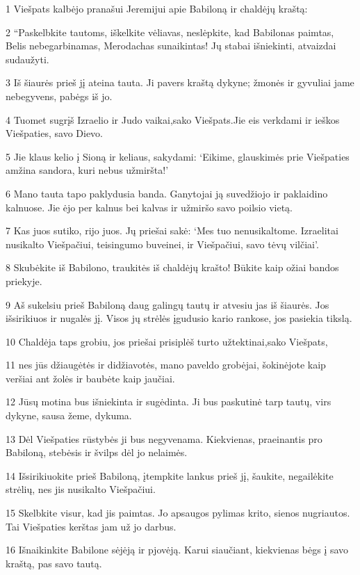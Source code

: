 \par 1 Viešpats kalbėjo pranašui Jeremijui apie Babiloną ir chaldėjų kraštą: 
\par 2 “Paskelbkite tautoms, iškelkite vėliavas, neslėpkite, kad Babilonas paimtas, Belis nebegarbinamas, Merodachas sunaikintas! Jų stabai išniekinti, atvaizdai sudaužyti. 
\par 3 Iš šiaurės prieš jį ateina tauta. Ji pavers kraštą dykyne; žmonės ir gyvuliai jame nebegyvens, pabėgs iš jo. 
\par 4 Tuomet sugrįš Izraelio ir Judo vaikai,­sako Viešpats.­Jie eis verkdami ir ieškos Viešpaties, savo Dievo. 
\par 5 Jie klaus kelio į Sioną ir keliaus, sakydami: ‘Eikime, glauskimės prie Viešpaties amžina sandora, kuri nebus užmiršta!’ 
\par 6 Mano tauta tapo paklydusia banda. Ganytojai ją suvedžiojo ir paklaidino kalnuose. Jie ėjo per kalnus bei kalvas ir užmiršo savo poilsio vietą. 
\par 7 Kas juos sutiko, rijo juos. Jų priešai sakė: ‘Mes tuo nenusikaltome. Izraelitai nusikalto Viešpačiui, teisingumo buveinei, ir Viešpačiui, savo tėvų vilčiai’. 
\par 8 Skubėkite iš Babilono, traukitės iš chaldėjų krašto! Būkite kaip ožiai bandos priekyje. 
\par 9 Aš sukelsiu prieš Babiloną daug galingų tautų ir atvesiu jas iš šiaurės. Jos išsirikiuos ir nugalės jį. Visos jų strėlės įgudusio kario rankose, jos pasiekia tikslą. 
\par 10 Chaldėja taps grobiu, jos priešai prisiplėš turto užtektinai,­sako Viešpats,­ 
\par 11 nes jūs džiaugėtės ir didžiavotės, mano paveldo grobėjai, šokinėjote kaip veršiai ant žolės ir baubėte kaip jaučiai. 
\par 12 Jūsų motina bus išniekinta ir sugėdinta. Ji bus paskutinė tarp tautų, virs dykyne, sausa žeme, dykuma. 
\par 13 Dėl Viešpaties rūstybės ji bus negyvenama. Kiekvienas, praeinantis pro Babiloną, stebėsis ir švilps dėl jo nelaimės. 
\par 14 Išsirikiuokite prieš Babiloną, įtempkite lankus prieš jį, šaukite, negailėkite strėlių, nes jis nusikalto Viešpačiui. 
\par 15 Skelbkite visur, kad jis paimtas. Jo apsaugos pylimas krito, sienos nugriautos. Tai Viešpaties kerštas jam už jo darbus. 
\par 16 Išnaikinkite Babilone sėjėją ir pjovėją. Karui siaučiant, kiekvienas bėgs į savo kraštą, pas savo tautą. 

